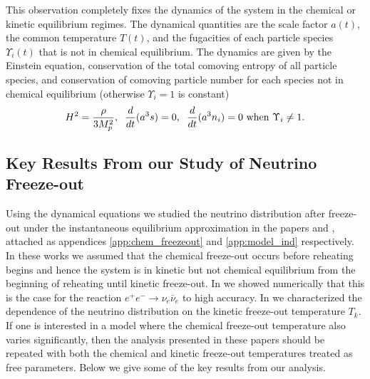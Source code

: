 This observation completely fixes the dynamics of the system in the chemical or kinetic equilibrium regimes.  The dynamical quantities are the scale factor $a(t)$, the common temperature $T(t)$, and the fugacities of each particle species $\Upsilon_i(t)$ that is not in chemical equilibrium.  The dynamics are given by the Einstein equation, conservation of the total comoving entropy of all particle species, and conservation of comoving particle number for each species not in chemical equilibrium (otherwise $\Upsilon_i=1$ is constant)
\begin{equation}\label{eq_dynamics}
H^2=\frac{\rho}{3M_p^2}, \hspace{2mm} \frac{d}{dt}(a^3s)=0,\hspace{2mm} \frac{d}{dt}(a^3n_i)=0 \text{ when } \Upsilon_i\neq 1.
\end{equation}

\subsection{Key Results From our Study of Neutrino Freeze-out}\label{nu_freezeout_summary}
Using the dynamical equations  we studied the neutrino distribution after freeze-out under the instantaneous equilibrium approximation in the papers \cite{Birrell2013} and \cite{Birrell:2013_2}, attached as appendices \ref{app:chem_freezeout} and \ref{app:model_ind} respectively.  In these works we assumed that the chemical freeze-out occurs before reheating begins and hence the system is in kinetic but not chemical equilibrium from the beginning of reheating until kinetic freeze-out.  In \cite{Birrell2013} we showed numerically that this is the case for the reaction $e^+e^-\rightarrow \nu_e\bar\nu_e$ to high accuracy.  In  \cite{Birrell:2013_2} we characterized the dependence of the neutrino distribution on the kinetic freeze-out temperature $T_k$.  If one is interested in a model where the chemical freeze-out temperature also varies significantly, then the analysis presented in these papers should be repeated with both the chemical and kinetic freeze-out temperatures treated as free parameters. Below we give some of the key results from our analysis.



